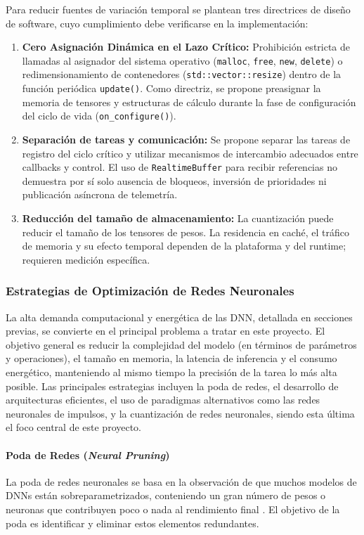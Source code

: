 \documentclass[12pt]{article}
\begin{document}
Para reducir fuentes de variación temporal se plantean tres directrices de diseño de software, cuyo cumplimiento debe verificarse en la implementación:
\begin{enumerate}
    \item \textbf{Cero Asignación Dinámica en el Lazo Crítico:} Prohibición estricta de llamadas al asignador del sistema operativo (\texttt{malloc}, \texttt{free}, \texttt{new}, \texttt{delete}) o redimensionamiento de contenedores (\texttt{std::vector::resize}) dentro de la función periódica \texttt{update()}. Como directriz, se propone preasignar la memoria de tensores y estructuras de cálculo durante la fase de configuración del ciclo de vida (\texttt{on\_configure()}).
    \item \textbf{Separación de tareas y comunicación:} Se propone separar las tareas de registro del ciclo crítico y utilizar mecanismos de intercambio adecuados entre callbacks y control. El uso de \texttt{RealtimeBuffer} para recibir referencias no demuestra por sí solo ausencia de bloqueos, inversión de prioridades ni publicación asíncrona de telemetría.
    \item \textbf{Reducción del tamaño de almacenamiento:} La cuantización puede reducir el tamaño de los tensores de pesos. La residencia en caché, el tráfico de memoria y su efecto temporal dependen de la plataforma y del runtime; requieren medición específica.
\end{enumerate}

\subsubsection{Estrategias de Optimización de Redes Neuronales}
\label{ssec:optimizacion_nn_exp}
La alta demanda computacional y energética de las DNN, detallada en secciones previas, se convierte en el principal problema a tratar en este proyecto. El objetivo general es reducir la complejidad del modelo (en términos de parámetros y operaciones), el tamaño en memoria, la latencia de inferencia y el consumo energético, manteniendo al mismo tiempo la precisión de la tarea lo más alta posible. Las principales estrategias incluyen la poda de redes, el desarrollo de arquitecturas eficientes, el uso de paradigmas alternativos como las redes neuronales de impulsos, y la cuantización de redes neuronales, siendo esta última el foco central de este proyecto.

\paragraph{Poda de Redes (\textit{Neural Pruning})}
\label{sssec:pruning_exp}
La poda de redes neuronales se basa en la observación de que muchos modelos de DNNs están sobreparametrizados, conteniendo un gran número de pesos o neuronas que contribuyen poco o nada al rendimiento final \cite{Liang2021PruningSurvey}. El objetivo de la poda es identificar y eliminar estos elementos redundantes.
\end{document}
